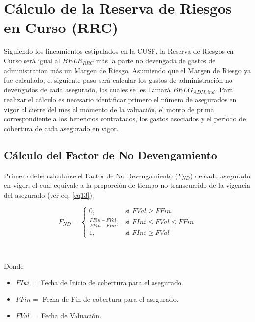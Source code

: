 \documentclass[11pt,twoside,openright,spanish]{report}
\numberwithin{equation}{chapter}
\numberwithin{figure}{chapter}
\numberwithin{table}{chapter}
\begin{document}
	 
\chapter{Cálculo de la Reserva de Riesgos en Curso (RRC)}\label{metnum}

	Siguiendo los lineamientos estipulados en la CUSF, la Reserva de Riesgos en Curso será igual al $BELR_{RRC}$ más la parte no devengada de gastos de administration más un Margen de Riesgo. Asumiendo que el Margen de Riesgo ya fue calculado, el siguiente paso será calcular los gastos de administración no devengados de cada asegurado, los cuales se les llamará $BELG_{ADM,ind}$.
	Para realizar el cálculo es necesario identificar primero el número de asegurados en vigor al cierre del mes al momento de la valuación, el monto de prima correspondiente a los beneficios contratados, los gastos asociados y el periodo de cobertura de cada asegurado en vigor.

\section{Cálculo del Factor de No Devengamiento}

	Primero debe calcularse el Factor de No Devengamiento ($F_{ND}$) de cada asegurado en vigor, el cual equivale a la proporción de tiempo no transcurrido de la vigencia del asegurado (ver eq. \ref{eq13}).


\begin{equation}	
	F_{ND}=\begin{cases}
		0, & \text{si } FVal \geqslant FFin.\\
		\frac{FFin-FVal}{FFin-FIni}, & \text{si } FIni \leqslant FVal \leqslant FFin\\
		1, & \text{si } FIni \geqslant FVal
	\end{cases}
	\label{eq13}
\end{equation}


$ $

Donde


\begin{itemize}
	\setlength\itemsep{-0.5em}
	\item $FIni=$ Fecha de Inicio de cobertura para el asegurado.
	
	\item $FFin=$ Fecha de Fin de cobertura para el asegurado.
	
	\item $FVal=$ Fecha de Valuación.
	
\end{itemize}
\end{document}
